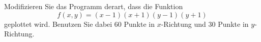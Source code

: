 \begin{aufg}
Modifizieren Sie das Programm  derart, dass  die
Funktion 
\[ f(x,y) = (x-1)(x+1)(y-1)(y+1) \]
geplottet wird. Benutzen Sie dabei $60$ Punkte in $x$-Richtung und $30$ Punkte
in $y$-Richtung. 
\end{aufg}

